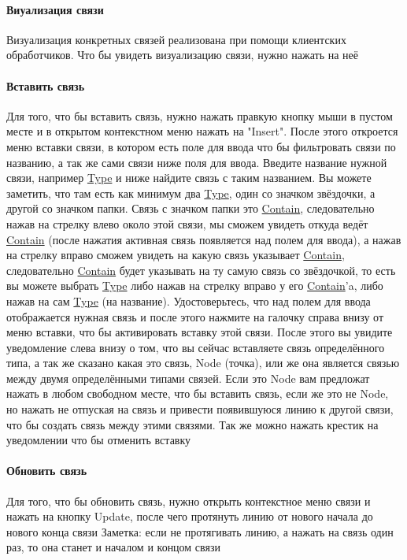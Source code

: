 \documentclass{article}
\begin{document}
\paragraph{Виуализация связи}
Визуализация конкретных связей реализована при помощи клиентских обработчиков.
Что бы увидеть визуализацию связи, нужно нажать на неё
\paragraph{Вставить связь}
Для того, что бы вставить связь, нужно нажать правкую кнопку мыши в пустом
месте и в открытом контекстном меню нажать на "Insert". После этого откроется
меню вставки связи, в котором есть поле для ввода что бы фильтровать связи по
названию, а так же сами связи ниже поля для ввода. Введите название нужной
связи, например \hyperlink{type.Def}{Type} и ниже найдите связь с таким
названием. Вы можете
заметить, что там есть как минимум два \hyperlink{type.Def}{Type}, один со
значком звёздочки, а
другой со значком папки. Связь с значком папки это \hyperlink{Contain.Def}{Contain}, следовательно нажав
на стрелку влево около этой связи, мы сможем увидеть откуда ведёт \hyperlink{Contain.Def}{Contain}
(после нажатия активная связь появляется над полем для ввода), а нажав на
стрелку вправо сможем увидеть на какую связь указывает \hyperlink{Contain.Def}{Contain}, следовательно
\hyperlink{Contain.Def}{Contain} будет указывать на ту самую связь со звёздочкой, то есть вы можете
выбрать \hyperlink{type.Def}{Type} либо нажав на стрелку вправо у его
\hyperlink{Contain.Def}{Contain}'a, либо нажав на сам
\hyperlink{type.Def}{Type} (на название). Удостоверьтесь, что над полем для
ввода отображается нужная
связь и после этого нажмите на галочку справа внизу от меню вставки, что бы
активировать вставку этой связи. После этого вы увидите уведомление слева внизу
о том, что вы сейчас вставляете связь определённого типа, а так же сказано
какая это связь, Node (точка), или же она является связью между двумя
определёнными типами связей. Если это Node вам предложат нажать в любом
свободном месте, что бы вставить связь, если же это не Node, но нажать не
отпуская на связь и привести появившуюся линию к другой связи, что бы создать
связь между этими связями. Так же можно нажать крестик на уведомлении что бы
отменить вставку
\paragraph{Обновить связь}
Для того, что бы обновить связь, нужно открыть контекстное меню связи и нажать
на кнопку Update, после чего протянуть линию от нового начала до нового конца
связи
Заметка: если не протягивать линию, а нажать на связь один раз, то она станет и
началом и концом связи
\end{document}
